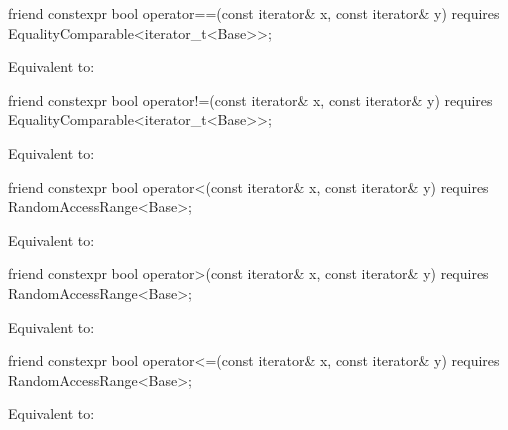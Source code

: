 \begin{itemdecl}
friend constexpr bool operator==(const iterator& x, const iterator& y)
  requires EqualityComparable<iterator_t<Base>>;
\end{itemdecl}

\begin{itemdescr}
\pnum
\effects Equivalent to: 
\end{itemdescr}

%
\begin{itemdecl}
friend constexpr bool operator!=(const iterator& x, const iterator& y)
  requires EqualityComparable<iterator_t<Base>>;
\end{itemdecl}

\begin{itemdescr}
\pnum
\effects Equivalent to: 
\end{itemdescr}

%
\begin{itemdecl}
friend constexpr bool operator<(const iterator& x, const iterator& y)
  requires RandomAccessRange<Base>;
\end{itemdecl}

\begin{itemdescr}
\pnum
\effects Equivalent to: 
\end{itemdescr}

%
\begin{itemdecl}
friend constexpr bool operator>(const iterator& x, const iterator& y)
  requires RandomAccessRange<Base>;
\end{itemdecl}

\begin{itemdescr}
\pnum
\effects Equivalent to: 
\end{itemdescr}

%
\begin{itemdecl}
friend constexpr bool operator<=(const iterator& x, const iterator& y)
  requires RandomAccessRange<Base>;
\end{itemdecl}

\begin{itemdescr}
\pnum
\effects Equivalent to: 
\end{itemdescr}

